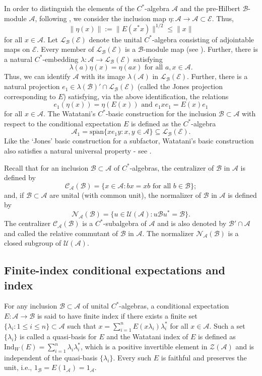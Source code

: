 \documentclass{amsart}
\numberwithin{equation}{section}
\newcommand{\Ind}{\mathrm{Ind}}
\newcommand{\mcal}{\mathcal}
\newcommand{\1}{\mathbf{1}}
\newcommand{\mA}{\mathcal{A}}
\newcommand{\mB}{\mathcal{B}}
\newcommand{\mZ}{\mathcal{Z}}
\newcommand{\mN}{\mathcal{N}}
\begin{document}
In order to distinguish the elements of the $C^*$-algebra $\mA$ and the
pre-Hilbert $\mB$-module $\mA$, following \cite{Wat}, we consider the
inclusion map $\eta : \mA \to \mA \subset \mcal{E}$. Thus,
\begin{equation}\label{eta-norm}
  \| \eta(x) \| := \|E(x^*x)\|^{1/2}\leq \|x\|
\end{equation}
for all $x \in \mA$. Let $\mathcal{L}_{\mB}(\mcal{E})$ denote the unital
$C^*$-algebra consisting of adjointable maps on $\mcal{E}$. Every
member of $\mathcal{L}_{\mB}(\mcal{E})$ is a $\mB$-module map (see \cite[$\S
  2.10$]{Wat}). Further, there is a natural $C^*$-embedding $\lambda: \mA
\to \mathcal{L}_{\mB}(\mcal{E})$ satisfying
\[
\lambda(a)\eta(x)=\eta(ax) \text{ for all } a,x \in \mA.
\]
Thus, we can identify $\mA$ with its image $\lambda(\mA)$ in
$\mcal{L}_{\mB}(\mcal{E})$. Further, there is a natural projection
$e_1 \in \lambda(\mB)'\cap \mathcal{L}_{\mB}(\mcal{E})$
(called the Jones projection corresponding to $E$) satisfying, via the
above identification, the relations
\[
e_1(\eta(x)) =\eta(E(x))\text{ and } e_1 x e_1 = E(x) e_1
\]
for all $x \in \mA$.  The Watatani's $C^*$-basic construction for the
inclusion $\mB \subset \mA$ with respect to the conditional
expectation $E$ is  defined as the $C^*$-algebra
\[
\mA_1=\overline{\mathrm{span}}\{ x e_1 y : x ,y \in \mA\} \subseteq
\mathcal{L}_{\mB}(\mcal{E}).
\]
Like the `Jones' basic construction for
a subfactor, Watatani's basic construction also satisfies a natural
universal property - see \cite[Proposition 2.2.11]{Wat}.  \smallskip

 Recall that for an inclusion $\mB \subset \mA$ of $C^*$-algebras, the
centralizer of $\mB$ in $\mA$ is defined by
\[
\mcal{C}_{\mA}(\mB) = \{ x \in \mA: bx = xb \text{ for all } b\in \mB\};
\]
and, if $\mB \subset \mA$ are unital (with common unit), the normalizer of $\mB$ in $\mA$ is defined by
\[
\mcal{N}_{\mA}(\mB) = \{ u \in \mcal{U}(\mA): u \mB u^* = \mB\}.
\]
The centralizer $\mcal{C}_{\mA}(\mB)$ is a $C^*$-subalgebra of $\mA$
and is also denoted by $\mB'\cap \mA$ and called the relative
commutant of $\mB$ in $\mA$. The normalizer $\mN_{\mA}(\mB)$
is a closed subgroup of $\mcal{U}(\mA)$.


\subsection{Finite-index conditional expectations and index}
For any inclusion $\mB \subset \mA$ of unital $C^*$-algebras, a
conditional expectation $E: \mA \to \mB$ is said to have finite index
if there exists a finite set $\{\lambda_i: 1 \leq i \leq n\} \subset
\mA$ such that $x = \sum_{i=1}^n E(x \lambda_i) \lambda_i^*$ for all
$x \in \mA$. Such a set $\{\lambda_i\}$ is called a quasi-basis for
$E$ and the Watatani index of $E$ is defined as $\Ind_W(E) =
\sum_{i=1}^n \lambda_i \lambda_i^*$, which is a positive invertible
element in $\mZ(\mA)$ and is independent of the quasi-basis
$\{\lambda_i\}$.  Every such $E$ is faithful and preserves the unit, i.e., $1_{\mB} = E(1_{\mA}) = 
1_{\mA}$.
\end{document}
